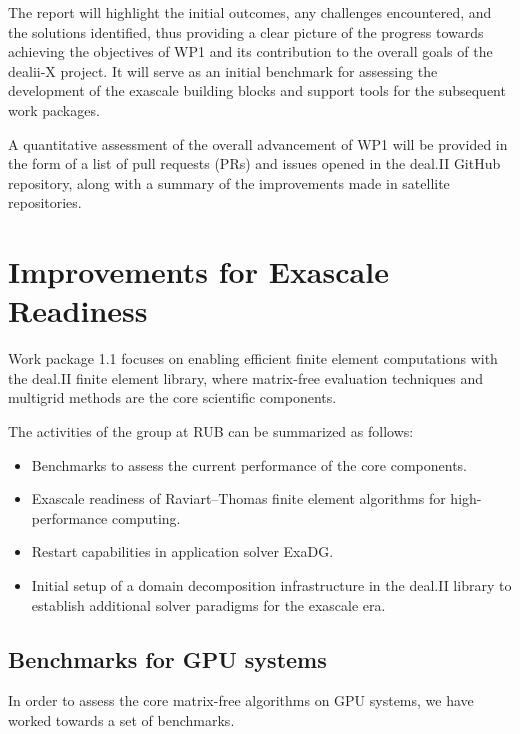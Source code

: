 \documentclass[a4paper,12pt]{article}
\begin{document}
The report will highlight the initial outcomes, any challenges encountered, and
the solutions identified, thus providing a clear picture of the progress towards
achieving the objectives of WP1 and its contribution to the overall goals of the
dealii-X project. It will serve as an initial benchmark for assessing the
development of the exascale building blocks and support tools for the subsequent
work packages.

A quantitative assessment of the overall advancement of WP1 will be provided in
the form of a list of pull requests (PRs) and issues opened in the deal.II
GitHub repository, along with a summary of the improvements made in satellite
repositories.

\section{Improvements for Exascale Readiness}

Work package 1.1 focuses on enabling efficient finite element computations
with the deal.II finite element library, where matrix-free evaluation
techniques and multigrid methods are the core scientific components.

The activities of the group at RUB can be summarized as follows:
\begin{itemize}
\item Benchmarks to assess the current performance of the core components.
\item Exascale readiness of Raviart--Thomas finite element algorithms for
  high-performance computing.
\item Restart capabilities in application solver ExaDG.
\item Initial setup of a domain decomposition infrastructure in the deal.II library to establish additional solver paradigms for the exascale era.
\end{itemize}

\subsection{Benchmarks for GPU systems}

In order to assess the core matrix-free algorithms on GPU systems, we have
worked towards a set of benchmarks.
\end{document}
